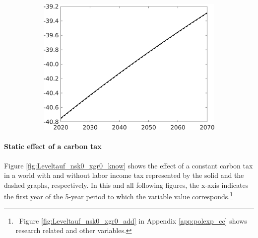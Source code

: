\begin{figure}[h!!]
\begin{subfigure}[]{0.4\textwidth}
\includegraphics[width=1\textwidth]{../../codding_model/own_basedOnFried/optimalPol_010922_revision/figures/all_13Sept22/PerdifNoTauf_regime5_CompTaul_F_spillover0_nsk0_xgr0_knspil0_sep0_LFlimit0_emsbase0_countec0_GovRev0_etaa0.79_lgd0.png}
\end{subfigure}
\end{figure} 

\paragraph{Static effect of a carbon tax}
 Figure \ref{fig:Leveltauf_nsk0_xgr0_know} shows the effect of a constant carbon tax in a world with and without labor income tax represented by the solid and the dashed graphs, respectively. In this and all following figures, the x-axis indicates the first year of the 5-year period to which the variable value corresponds.\footnote{\ Figure \ref{fig:Leveltauf_nsk0_xgr0_add} in Appendix \ref{app:polexp_cc} shows research related and other variables.}  
 

